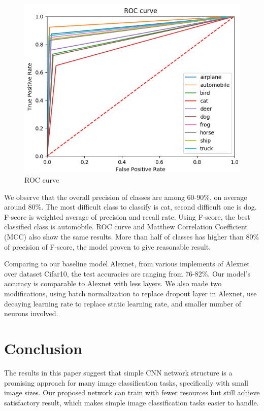 \documentclass[journal,onecolumn]{IEEEtran}
\begin{document}
\begin{figure}[!t]
\includegraphics[width=0.6\paperwidth]{images/roc}
\caption{ROC curve}
\end{figure}


We observe that the overall precision of classes are among 60-90\%, on average around 80\%. The most difficult class to classify is cat, second difficult one is dog. F-score is weighted average of precision and recall rate. Using F-score, the best classified class is automobile. ROC curve and Matthew Correlation Coefficient (MCC) also show the same results. More than half of classes has higher than 80\% of precision of F-score, the model proven to give reasonable result.

Comparing to our baseline model Alexnet, from various implements of Alexnet over dataset Cifar10, the test accuracies are ranging from 76-82\%. \cite{alex1, alex2} Our model’s accuracy is comparable to Alexnet with less layers. We also made two modifications, using batch normalization to replace dropout layer in Alexnet, use decaying learning rate to replace static learning rate, and smaller number of neurons involved.


\section{Conclusion}
The results in this paper suggest that simple CNN network structure is a promising approach for many image classification tasks, specifically with small image sizes. Our proposed network can train with fewer resources but still achieve satisfactory result, which makes simple image classification tasks easier to handle.
\end{document}
